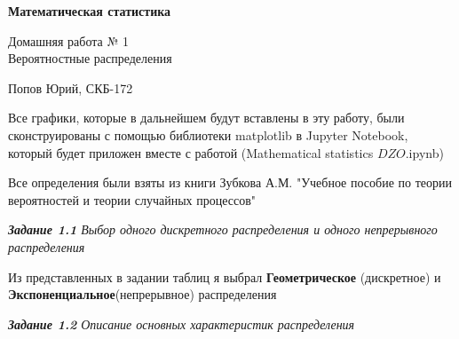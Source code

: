 \documentclass[a4paper,12pt, oneside]{book}
\begin{document}
\pagestyle{plain}

\begin{titlepage}	
	\begin{center}
		{\Huge \textbf{Математическая статистика}}
		\vspace{\baselineskip}
		
		{\huge Домашняя работа № 1 \\}
		\vspace{\baselineskip}
		{\huge Вероятностные распределения}
		\vspace{\baselineskip}
		
		{\large Попов Юрий, СКБ-172}
	\end{center}
\end{titlepage}



\begin{spacing}{0.99}          
	\tableofcontents %
\end{spacing}

\newpage
Все графики, которые в дальнейшем будут вставлены в эту работу, были сконструированы с помощью библиотеки matplotlib в Jupyter Notebook, который будет приложен вместе с работой (Mathematical statistics $DZO$.ipynb)

\vspace{5mm}

Все определения были взяты из книги Зубкова А.М. "Учебное пособие по теории вероятностей и теории случайных процессов"


\vspace{13mm}%
\textit{\textbf{Задание 1.1} Выбор одного дискретного распределения и одного непрерывного распределения}


\vspace{13mm}




Из представленных в задании таблиц я выбрал \textbf{Геометрическое} (дискретное) и \textbf{Экспоненциальное}(непрерывное) распределения

\vspace{\baselineskip}
\newpage
\vspace{13mm}%
\textit{\textbf{Задание 1.2} Описание основных характеристик распределения}
\\
\end{document}
